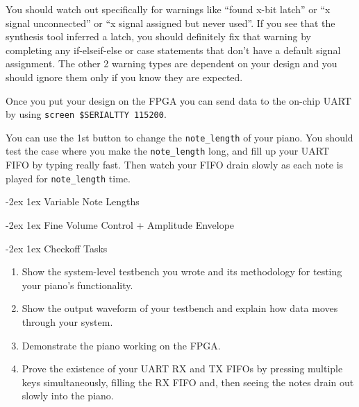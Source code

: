 \documentclass[11pt]{article}
\makeatletter
\renewcommand{\section}
{\@startsection {section}{1}{0pt}
 {-2ex}
 {1ex}
 {\bfseries\Large}}
\makeatother
\begin{document}
You should watch out specifically for warnings like ``found x-bit latch'' or ``x signal unconnected'' or ``x signal assigned but never used''.
If you see that the synthesis tool inferred a latch, you should definitely fix that warning by completing any if-elseif-else or case statements that don't have a default signal assignment.
The other 2 warning types are dependent on your design and you should ignore them only if you know they are expected.

Once you put your design on the FPGA you can send data to the on-chip UART by using \verb|screen $SERIALTTY 115200|.

You can use the 1st button to change the \verb|note_length| of your piano.
You should test the case where you make the \verb|note_length| long, and fill up your UART FIFO by typing really fast.
Then watch your FIFO drain slowly as each note is played for \verb|note_length| time.

\section{Variable Note Lengths}

\section{Fine Volume Control + Amplitude Envelope}

\section{Checkoff Tasks}
\begin{enumerate}
  \item Show the system-level testbench you wrote and its methodology for testing your piano's functionality.
  \item Show the output waveform of your testbench and explain how data moves through your system.
  \item Demonstrate the piano working on the FPGA.
  \item Prove the existence of your UART RX and TX FIFOs by pressing multiple keys simultaneously, filling the RX FIFO and, then seeing the notes drain out slowly into the piano.
\end{enumerate}
\end{document}
